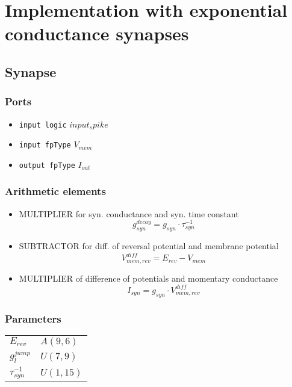 \chapter{Implementation with exponential conductance synapses}
\section{Synapse}
\subsection{Ports}
	\begin{itemize}
		\item \texttt{input logic} $input_spike$
		\item \texttt{input fpType} $V_{mem}$
		\item \texttt{output fpType} $I_{out}$
	\end{itemize}
\subsection{Arithmetic elements}
\begin{itemize}
	\item MULTIPLIER for syn. conductance and syn. time constant
		\begin{equation}
			g_{syn}^{decay} = g_{syn} \cdot \tau_{syn}^{-1}
		\end{equation}
	\item SUBTRACTOR for diff. of reversal potential and membrane potential
		\begin{equation}
			V_{mem,rev}^{diff} = E_{rev} - V_{mem}
		\end{equation}
	\item MULTIPLIER of difference of potentials and momentary conductance
		\begin{equation}
			I_{syn} = g_{syn} \cdot V_{mem,rev}^{diff}
		\end{equation}
\end{itemize}
\subsection{Parameters}
\begin{tabular}{ll}
$E_{rev}$ & $A(9,6)$\\
$g_l^{jump}$ & $U(7,9)$\\
$\tau_{syn}^{-1}$ & $U(1,15)$\\
\end{tabular}
